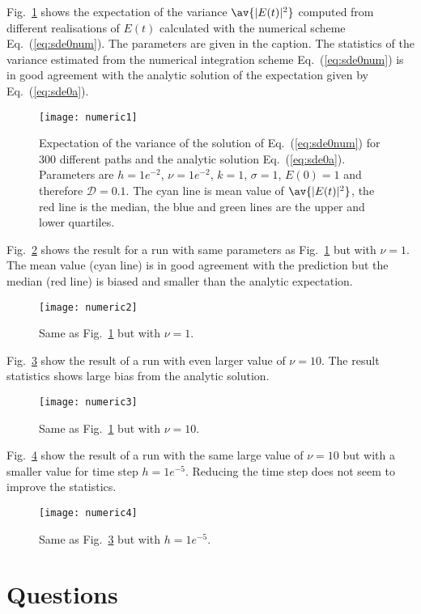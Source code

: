 \documentclass[10pt,a4paper]{article}
\newcommand{\eq}[1]{Eq.~(\ref{#1})}
\newcommand{\fig}[1]{Fig.~\ref{#1}}
\newcommand{\src}{\ensuremath{\mathcal{D}}}
\begin{document}
\fig{fig:linwaves1} shows the expectation of the variance $\av{|E(t)|^2}$ computed from
different realisations of $E(t)$ calculated with the numerical scheme \eq{eq:sde0num}.
The parameters are given in the caption. The statistics of the variance estimated from the 
numerical integration scheme \eq{eq:sde0num} is in good agreement with the analytic
solution of the expectation given by \eq{eq:sde0a}.

\begin{figure}[ht]
\centering\texttt{[image: numeric1]}
\caption{Expectation of the variance of the solution of \eq{eq:sde0num} for 300
different paths and the analytic solution \eq{eq:sde0a}. Parameters are
$h=1e^{-2}$, $\nu=1e^{-2}$, $k=1$, $\sigma=1$, $E(0)=1$ and therefore $\src=0.1$.
The cyan line is mean value of $\av{|E(t)|^2}$, the red line is the median, the blue and green
lines are the upper and lower quartiles.}
\label{fig:linwaves1}
\end{figure}

\fig{fig:linwaves2} shows the result for a run with same parameters as
\fig{fig:linwaves1} but with $\nu=1$. 
The mean value (cyan line) is in good agreement with the prediction but the median (red line) 
is biased and smaller than the analytic expectation.
\begin{figure}[ht]
\centering\texttt{[image: numeric2]}
\caption{Same as \fig{fig:linwaves1} but with $\nu=1$.}
\label{fig:linwaves2}
\end{figure}

\fig{fig:linwaves3} show the result of a run with even larger value of $\nu=10$. 
The result statistics shows large bias from the analytic solution.
\begin{figure}[ht]
\centering\texttt{[image: numeric3]}
\caption{Same as \fig{fig:linwaves1} but with $\nu=10$.}
\label{fig:linwaves3}
\end{figure}

\fig{fig:linwaves4} show the result of a run with the same large value of $\nu=10$ but
with a smaller value for time step $h=1e^{-5}$. Reducing the time step does not seem to improve
the statistics.
\begin{figure}[ht]
\centering\texttt{[image: numeric4]}
\caption{Same as \fig{fig:linwaves3} but with $h=1e^{-5}$.}
\label{fig:linwaves4}
\end{figure}


\section{Questions}
\end{document}
